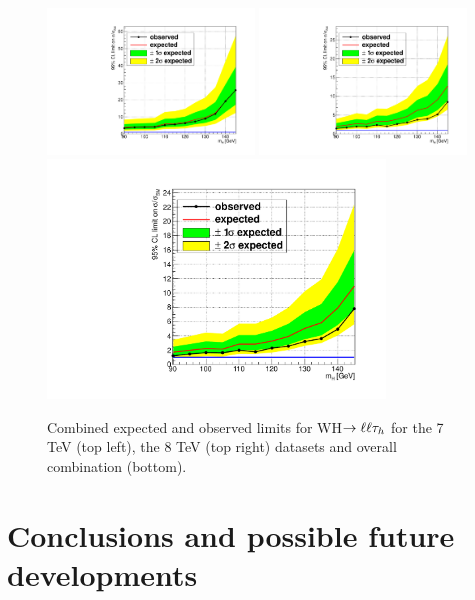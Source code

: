 \begin{figure}
\begin{center}
  \includegraphics[width=0.49\textwidth]{4_Analisys/pics/limits/vhtt_wh/vhtt_wh_7TeV.pdf}
  \includegraphics[width=0.49\textwidth]{4_Analisys/pics/limits/vhtt_wh/vhtt_wh_8TeV.pdf}\\
  \includegraphics[width=0.8\textwidth]{4_Analisys/pics/limits/vhtt_wh/vhtt_wh.pdf}
  \caption{Combined expected and observed limits for WH$\rightarrow\ell\ell\tau_h$ for the 7 TeV (top left), the 8 TeV (top right) datasets and overall combination (bottom).}
  \label{fig:llt_limits}
\end{center}
\end{figure}

\chapter{Conclusions and possible future developments}

